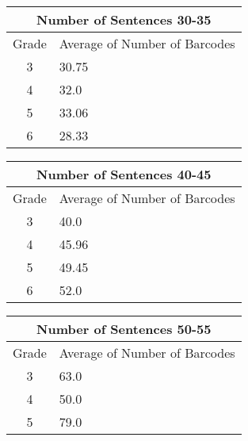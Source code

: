 \begin{figure}[htbp]
  \begin{minipage}[t]{0.33\textwidth}
  \centering
  \begin{tabular}{|c|p{2.5cm}|}
  \hline
  \multicolumn{2}{|c|}{Number of Sentences 30-35} \\
  \hline
  Grade & Average of Number of Barcodes \\
  \hline
  3 & 30.75 \\
  4 & 32.0 \\
  5 & 33.06 \\
  6 & 28.33 \\
  \hline
  \end{tabular}
  \end{minipage}%
  \begin{minipage}[t]{0.33\textwidth}
  \centering
  \begin{tabular}{|c|p{2.5cm}|}
  \hline
  \multicolumn{2}{|c|}{Number of Sentences 40-45} \\
  \hline
  Grade & Average of Number of Barcodes \\
  \hline
  3 & 40.0 \\
  4 & 45.96 \\
  5 & 49.45 \\
  6 & 52.0 \\
  \hline
  \end{tabular}
  \end{minipage}%
  \begin{minipage}[t]{0.33\textwidth}
  \centering
  \begin{tabular}{|c|p{2.5cm}|}
  \hline
  \multicolumn{2}{|c|}{Number of Sentences 50-55} \\
  \hline
  Grade & Average of Number of Barcodes \\
  \hline
  3 & 63.0 \\
  4 & 50.0 \\
  5 & 79.0 \\
  \hline
  \end{tabular}
  \end{minipage}

\end{figure}
